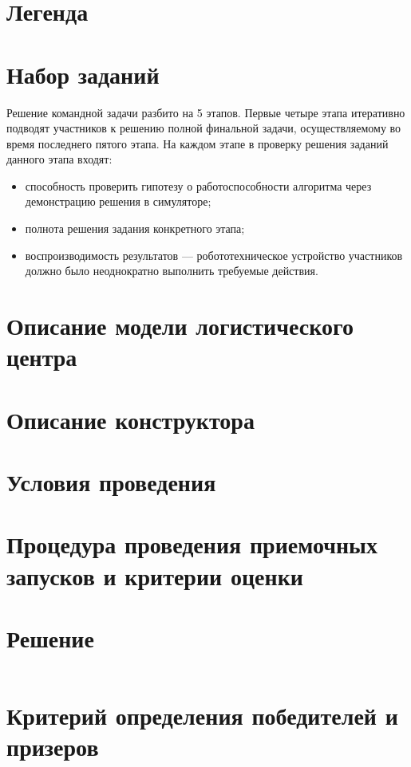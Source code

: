\section{Легенда}


\section{Набор заданий}

Решение командной задачи разбито на 5 этапов. Первые четыре
этапа итеративно подводят участников к решению полной финальной
задачи, осуществляемому во время последнего пятого этапа. На
каждом этапе в проверку решения заданий данного этапа входят:
\begin{itemize}
    \item способность проверить гипотезу о работоспособности алгоритма
    через демонстрацию решения в симуляторе;
    \item полнота решения задания конкретного этапа;
    \item воспроизводимость результатов --- робототехническое
    устройство участников должно было неоднократно выполнить требуемые
    действия.
\end{itemize}



\section{Описание модели логистического центра}


\section{Описание конструктора}


\section{Условия проведения}


\section{Процедура проведения приемочных запусков и
критерии оценки}



\section{Решение}
\inputminted[fontsize=\footnotesize, linenos]{js}{team_final/solution.js}

\section{Критерий определения победителей и призеров}

